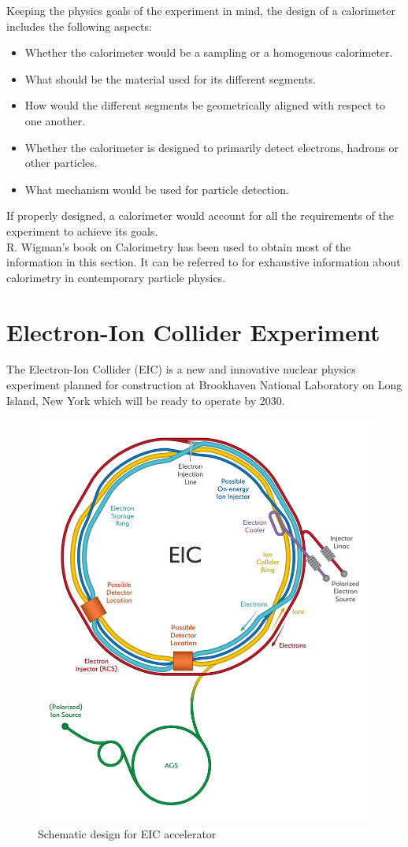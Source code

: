 Keeping the physics goals of the experiment in mind, the design of a calorimeter includes the following aspects:
\begin{itemize}
    \item Whether the calorimeter would be a sampling or a homogenous calorimeter.
    \item What should be the material used for its different segments.
    \item How would the different segments be geometrically aligned with respect to one another.
    \item Whether the calorimeter is designed to primarily detect electrons, hadrons or other particles.
    \item What mechanism would be used for particle detection.
\end{itemize}

If properly designed, a calorimeter would account for all the requirements of the experiment to achieve its goals. \\

R. Wigman's book on Calorimetry \cite{principles} has been used to obtain most of the information in this section. It can be referred to for exhaustive information about calorimetry in contemporary particle physics.

\section{Electron-Ion Collider Experiment } %
The Electron-Ion Collider (EIC) is a new and innovative nuclear physics experiment planned for construction at Brookhaven National Laboratory on Long Island, New York which will be ready to operate by 2030. 

\begin{figure}[H]
        \centering
		\includegraphics[width=0.5\linewidth]{group1/eic-hr.jpg}
		\caption{Schematic design for EIC accelerator}
		\label{fig:g1_ch1_img1}
\end{figure} 

